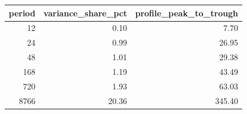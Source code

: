 \begin{tabular}{rrr}
\toprule
period & variance\_share\_pct & profile\_peak\_to\_trough \\
\midrule
12 & 0.10 & 7.70 \\
24 & 0.99 & 26.95 \\
48 & 1.01 & 29.38 \\
168 & 1.19 & 43.49 \\
720 & 1.93 & 63.03 \\
8766 & 20.36 & 345.40 \\
\bottomrule
\end{tabular}
